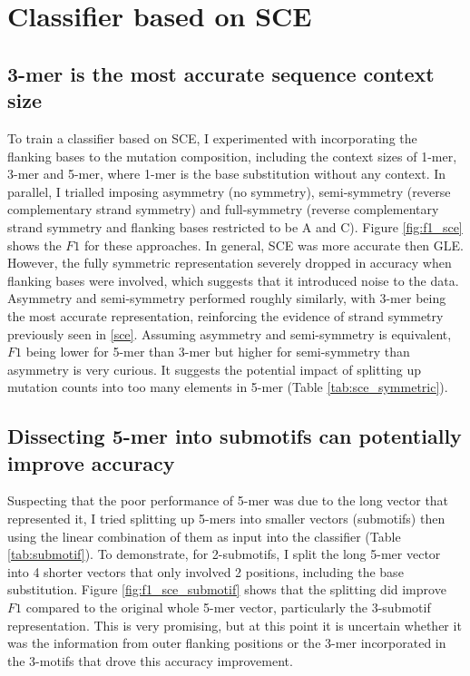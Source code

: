

\newpage
\section{Classifier based on SCE}\label{ml:sce}

\subsection{3-mer is the most accurate sequence context size}
To train a classifier based on SCE, I experimented with incorporating the flanking bases to the mutation composition, including the context sizes of 1-mer, 3-mer and 5-mer, where 1-mer is the base substitution without any context. In parallel, I trialled imposing asymmetry (no symmetry), semi-symmetry (reverse complementary strand symmetry) and full-symmetry (reverse complementary strand symmetry and flanking bases restricted to be A and C). Figure \ref{fig:f1_sce} shows the $F1$ for these approaches. In general, SCE was more accurate then GLE. However, the fully symmetric representation severely dropped in accuracy when flanking bases were involved, which suggests that it introduced noise to the data. Asymmetry and semi-symmetry performed roughly similarly, with 3-mer being the most accurate representation, reinforcing the evidence of strand symmetry previously seen in \ref{sce}. Assuming asymmetry and semi-symmetry is equivalent, $F1$ being lower for 5-mer than 3-mer but higher for semi-symmetry than asymmetry is very curious. It suggests the potential impact of splitting up mutation counts into too many elements in 5-mer (Table \ref{tab:sce_symmetric}).



\subsection{Dissecting 5-mer into submotifs can potentially improve accuracy}
Suspecting that the poor performance of 5-mer was due to the long vector that represented it, I tried splitting up 5-mers into smaller vectors (submotifs) then using the linear combination of them as input into the classifier (Table \ref{tab:submotif}). To demonstrate, for 2-submotifs, I split the long 5-mer vector into 4 shorter vectors that only involved 2 positions, including the base substitution. Figure \ref{fig:f1_sce_submotif} shows that the splitting did improve $F1$ compared to the original whole 5-mer vector, particularly the 3-submotif representation. This is very promising, but at this point it is uncertain whether it was the information from outer flanking positions or the 3-mer incorporated in the 3-motifs that drove this accuracy improvement.

